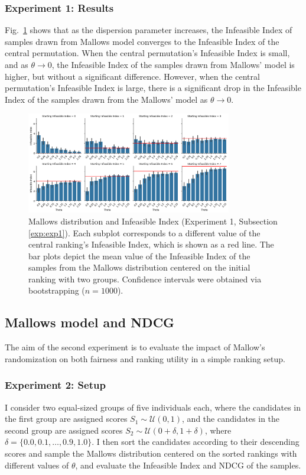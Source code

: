 \subsubsection{Experiment 1: Results} Fig.~\ref{plot:experiment1} shows that as the dispersion parameter increases, the Infeasible Index of samples drawn from Mallows model converges to the Infeasible Index of the central permutation. When the central permutation's Infeasible Index is small, and as  $\theta \rightarrow 0$, the Infeasible Index of the samples drawn from Mallows' model is higher, but without a significant difference. However, when the central permutation's Infeasible Index is large, there is a significant drop in the Infeasible Index of the samples drawn from the Mallows' model as $\theta \rightarrow 0$.

\begin{figure}[h]
  \centering
  \includegraphics[width=0.8\textwidth]{resources/EXP1_NEW.png}
  \caption{Mallows distribution and Infeasible Index (Experiment 1, Subsection \ref{exp:exp1}). Each subplot corresponds to a different value of the central ranking's Infeasible Index, which is shown as a red line. The bar plots depict the mean value of the Infeasible Index of the samples from the Mallows distribution centered on the initial ranking with two groups. Confidence intervals were obtained via bootstrapping ($n=1000$).}
  \label{plot:experiment1}
\end{figure}


\subsection{Mallows model and NDCG}\label{exp:exp2}
\label{sec:uniform-exp}
The aim of the second experiment is to evaluate the impact of Mallow's randomization on both fairness and ranking utility in a simple ranking setup.

\subsubsection{Experiment 2: Setup}
I consider two equal-sized groups of five individuals each, where the candidates in the first group are assigned scores $S_1 \sim \mathcal{U}(0,1)$, and the candidates in the second group are assigned scores $S_2 \sim \mathcal{U}(0 + \delta, 1 + \delta)$, where $\delta = \{0.0, 0.1,\dots,0.9,1.0\}$. 
I then sort the candidates according to their descending scores and sample the Mallows distribution centered on the sorted rankings with different values of $\theta$, and evaluate the Infeasible Index and NDCG of the samples.

